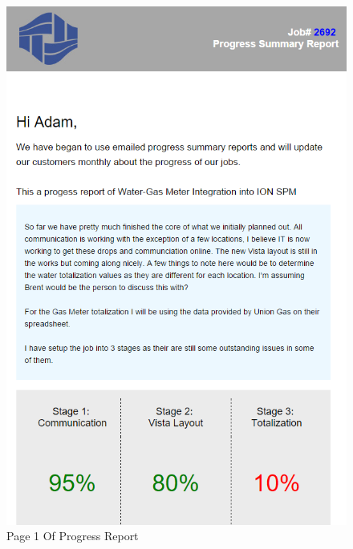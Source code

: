 %

\begin{figure}
		
		\begin{center}
		\includegraphics[width=5in, keepaspectratio=true]{../Images/ProgressReport1.PNG}
		\end{center}
	\caption{Page 1 Of Progress Report}
	\label{fig:Page1OfProgressReport}
\end{figure}



